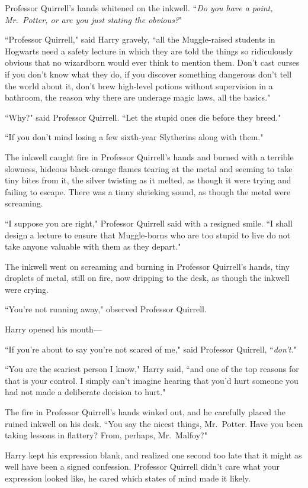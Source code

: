 Professor Quirrell's hands whitened on the inkwell. ``\emph{Do you have a point, Mr.~Potter, or are you just stating the obvious?}"

``Professor Quirrell," said Harry gravely, ``all the Muggle-raised students in Hogwarts need a safety lecture in which they are told the things so ridiculously obvious that no wizardborn would ever think to mention them. Don't cast curses if you don't know what they do, if you discover something dangerous don't tell the world about it, don't brew high-level potions without supervision in a bathroom, the reason why there are underage magic laws, all the basics."

``Why?" said Professor Quirrell. ``Let the stupid ones die before they breed."

``If you don't mind losing a few sixth-year Slytherins along with them."

The inkwell caught fire in Professor Quirrell's hands and burned with a terrible slowness, hideous black-orange flames tearing at the metal and seeming to take tiny bites from it, the silver twisting as it melted, as though it were trying and failing to escape. There was a tinny shrieking sound, as though the metal were screaming.

``I suppose you are right," Professor Quirrell said with a resigned smile. ``I shall design a lecture to ensure that Muggle-borns who are too stupid to live do not take anyone valuable with them as they depart."

The inkwell went on screaming and burning in Professor Quirrell's hands, tiny droplets of metal, still on fire, now dripping to the desk, as though the inkwell were crying.

``You're not running away," observed Professor Quirrell.

Harry opened his mouth---

``If you're about to say you're not scared of me," said Professor Quirrell, ``\emph{don't.}"

``You are the scariest person I know," Harry said, ``and one of the top reasons for that is your control. I simply can't imagine hearing that you'd hurt someone you had not made a deliberate decision to hurt."

The fire in Professor Quirrell's hands winked out, and he carefully placed the ruined inkwell on his desk. ``You say the nicest things, Mr.~Potter. Have you been taking lessons in flattery? From, perhaps, Mr.~Malfoy?"

Harry kept his expression blank, and realized one second too late that it might as well have been a signed confession. Professor Quirrell didn't care what your expression looked like, he cared which states of mind made it likely.

